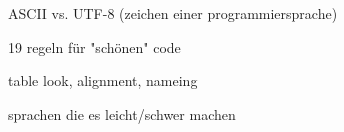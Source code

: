 \documentclass[a4paper]{article}
\begin{document}
ASCII vs. UTF-8 (zeichen einer programmiersprache) \cite{Kamp}

19 regeln für "schönen" code \cite{Peters}

table look, alignment, nameing \cite{Green}

sprachen die es leicht/schwer machen \cite{Spinellis}


\appendix

\newpage

\nocite{*}
 
\printbibliography
{}

\newpage
 
\listoffigures

\newpage
 
\renewcommand\listoflistingscaption{Quellcodeverzeichnis}
\listoflistings
\end{document}
